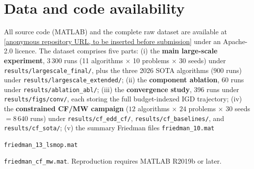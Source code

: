 \section*{Data and code availability}

All source code (MATLAB) and the complete
raw dataset are available at
\url{[anonymous repository URL,
to be inserted before submission]}
under an Apache-2.0 licence.
The dataset comprises five parts:
(i) the \textbf{main large-scale
experiment}, $3\,300$ runs
(11 algorithms $\times$ 10
problems $\times$ 30
seeds) under
\texttt{results/largescale\_final/},
plus the three
2026 SOTA
algorithms ($900$ runs)
under
\texttt{results/largescale\_extended/};
(ii) the \textbf{component
ablation}, 60 runs under
\texttt{results/ablation\_abl/};
(iii) the \textbf{convergence
study}, 396 runs under
\texttt{results/figs/conv/},
each storing the
full budget-indexed
IGD trajectory;
(iv) the \textbf{constrained
CF/MW campaign}
($12$ algorithms $\times$ $24$
problems $\times$
$30$ seeds
$= 8\,640$ runs) under
\texttt{results/cf\_edd\_cf/},
\texttt{results/cf\_baselines/},
and
\texttt{results/cf\_sota/};
(v) the summary
Friedman files
\texttt{friedman\_10.mat}\par
\texttt{friedman\_13\_lsmop.mat}\par
\texttt{friedman\_cf\_mw.mat}.
Reproduction requires
MATLAB R2019b
or later.
